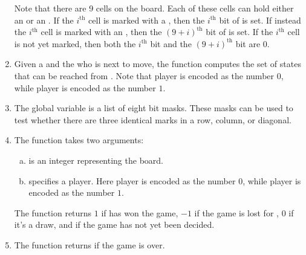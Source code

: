 \begin{enumerate}
      Note that there are 9 cells on the board.  Each of these cells can hold either an  or an
      .  If the $i^\textrm{th}$ cell is marked with a , then the $i^\textrm{th}$ bit of
       is set.  If instead the $i^\textrm{th}$ cell is marked with an , then the
      $(9+i)^\textrm{th}$ bit of  is set.  If the $i^\textrm{th}$ cell is not yet marked, then both the
      $i^\textrm{th}$ bit and the $(9+i)^\textrm{th}$ bit are $0$.   
\item Given a  and the  who is next to move, the function 
      computes the set of states that can be reached from .  Note that player  is
      encoded as the number $0$, while player  is encoded as the number $1$.
\item The global variable  is a list of eight bit masks.  These masks can be used to test
      whether there are three identical marks in a row, column, or diagonal. 
\item The function  takes two arguments:
      \begin{enumerate}[(a)]
      \item {}  is an integer representing the board.
      \item {} specifies a player. Here player  is encoded as the number $0$, while
            player  is encoded as the number $1$.
      \end{enumerate}
      The function returns $1$ if  has won the game, $-1$ if the game is lost for
      , $0$ if it's a draw, and  if the game has not yet been decided.
\item The function  returns  if the game is over.
\end{enumerate}


